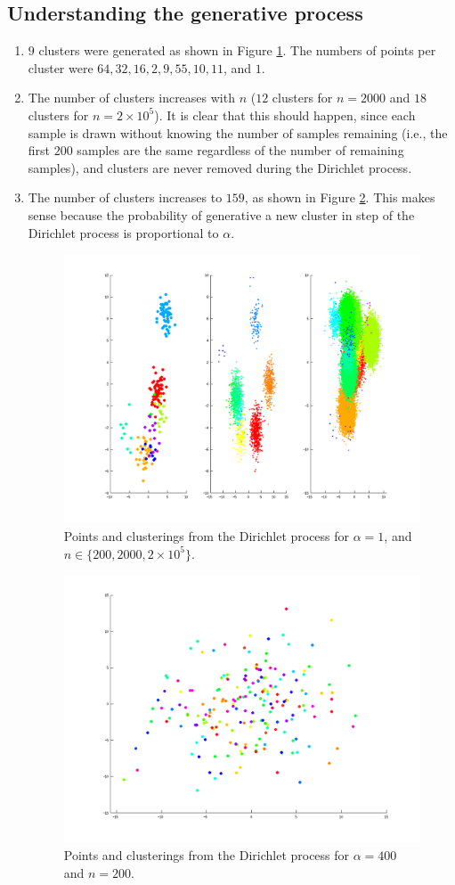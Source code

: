 \documentclass[11pt]{article}
\begin{document}
\subsection{Understanding the generative process}
\begin{enumerate}
\item $9$ clusters were generated as shown in Figure \ref{fig:2_1_1}. The
numbers of points per cluster were $64, 32, 16, 2, 9, 55, 10, 11$, and $1$.
\item The number of clusters increases with $n$ ($12$ clusters for $n = 2000$
and $18$ clusters for $n = 2 \times 10^5$). It is clear that this should
happen, since each sample is drawn without knowing the number of samples
remaining (i.e., the first $200$ samples are the same regardless of the number
of remaining samples), and clusters are never removed during the Dirichlet
process.
\item The number of clusters increases to $159$, as shown in Figure
\ref{fig:2_1_2}. This makes sense because the probability of generative a new
cluster in step of the Dirichlet process is proportional to $\alpha$.
\begin{figure}[h!]
\centering
\quad\;
\includegraphics[trim=23mm 0mm 0mm 0mm, clip=true, height=80mm, width=150mm]{2_1_1}
\vspace{-10mm}
\caption{Points and clusterings from the Dirichlet process for $\alpha = 1$,
and $n \in \{200, 2000, 2 \times 10^5\}$.}
\label{fig:2_1_1}
\end{figure}
\begin{figure}[h!]
\centering
\quad\;
\includegraphics[trim=23mm 0mm 0mm 0mm, clip=true, width=0.6\linewidth]{2_1_2}
\vspace{-8mm}
\caption{Points and clusterings from the Dirichlet process for $\alpha = 400$
and $n = 200$.}
\label{fig:2_1_2}
\end{figure}
\end{enumerate}
\end{document}
